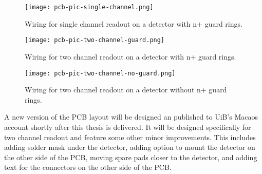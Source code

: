 \documentclass[../main/thesis.tex]{subfiles}
\begin{document}
\begin{figure}%
	\centering
	\texttt{[image: pcb-pic-single-channel.png]}
	\caption{Wiring for single channel readout on a detector with n+ guard rings.}
	\label{fig-wiring-1-g} 
\end{figure}

\begin{figure}%
	\centering
	\texttt{[image: pcb-pic-two-channel-guard.png]}
	\caption{Wiring for two channel readout on a detector with n+ guard rings.}
	\label{fig-wiring-2-g} 
\end{figure}

\begin{figure}%
	\centering
	\texttt{[image: pcb-pic-two-channel-no-guard.png]}
	\caption{Wiring for two channel readout on a detector without n+ guard rings.}
	\label{fig-wiring-2} 
\end{figure}

A new version of the PCB layout will be designed an published to UiB's Macaos account shortly after this thesis is delivered. It will be designed specifically for two channel readout and feature some other minor improvements. This includes adding solder mask under the detector, adding option to mount the detector on the other side of the PCB, moving spare pads closer to the detector, and adding text for the connectors on the other side of the PCB. 

\end{document}

